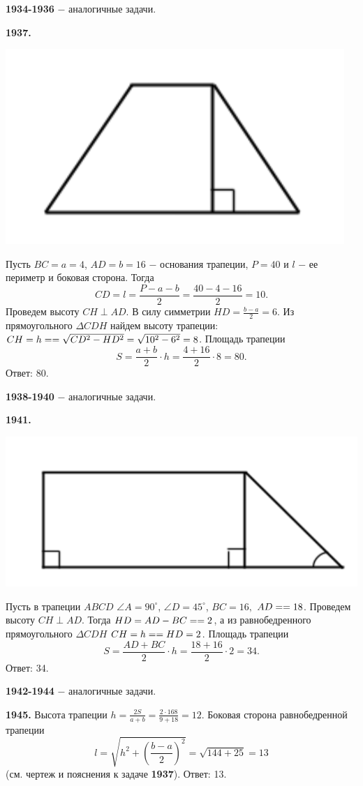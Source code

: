 \textbf{1934-1936} $-$ аналогичные задачи.

\textbf{1937.}

{\centering \includegraphics[width=0.45\linewidth]{Geometry/Content/28.png}
	
}

Пусть $BC = a = 4$, $AD = b = 16$ $-$ основания трапеции, $P=40$ и $l$ $-$ ее периметр и боковая сторона. Тогда
\[
CD = l = \frac{P-a-b}{2} = \frac{40-4-16}{2} = 10.
\]
Проведем высоту $CH \perp AD$. В силу симметрии $HD = \frac{b - a}{2} = 6$. Из прямоугольного $\Delta CDH$ найдем высоту трапеции: $CH = h =\linebreak= \sqrt{CD^2-HD^2} = \sqrt{10^2-6^2} = 8$. Площадь трапеции
\[
S = \frac{a+b}{2}\cdot h = \frac{4 + 16}{2} \cdot 8 = 80.
\] \null \hspace*{\fill} Ответ: 80.

\textbf{1938-1940} $-$ аналогичные задачи.

\textbf{1941.}

{\centering \includegraphics[width=0.45\linewidth]{Geometry/Content/29.png}
	
}

Пусть в трапеции $ABCD$ $\angle A = 90^\circ$, $\angle D = 45^\circ$, $BC = 16,$ $AD = \linebreak=18$. Проведем высоту $CH \perp AD$. Тогда $HD = AD - BC = \linebreak = 2$, а из равнобедренного прямоугольного $\Delta CDH$ $CH = h = \linebreak = HD = 2$. Площадь трапеции
\[
S = \frac{AD + BC}{2}\cdot h = \frac{18+16}{2}\cdot2=34.
\] \null \hspace*{\fill} Ответ: 34.

\textbf{1942-1944} $-$ аналогичные задачи.

\textbf{1945.} Высота трапеции $h = \frac{2S}{a+b} = \frac{2 \cdot 168}{9+18} = 12$. Боковая сторона равнобедренной трапеции
\[
l = \sqrt{h^2+\left( \frac{b-a}{2} \right)^2} = \sqrt{144 + 25} =13
\]  (см. чертеж и пояснения к задаче \textbf{1937}).\newline \null \hspace*{\fill} Ответ: 13.

